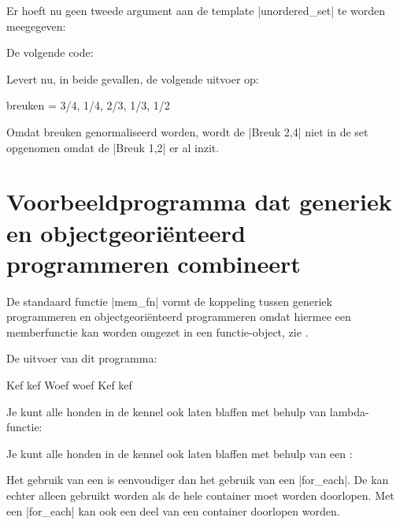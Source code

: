 \begin{cpplstShortInline}

Er hoeft nu geen tweede argument aan de template |unordered_set| te worden meegegeven:


De volgende code:


Levert nu, in beide gevallen, de volgende uitvoer op:
\begin{coutput}
breuken = {3/4, 1/4, 2/3, 1/3, 1/2}
\end{coutput}

Omdat breuken genormaliseerd worden, wordt de |Breuk {2,4}| niet in de set opgenomen omdat de |Breuk {1,2}| er al inzit.

\section{Voorbeeldprogramma dat generiek en objectgeoriënteerd programmeren combineert}
De standaard functie |mem_fn| vormt de koppeling tussen generiek programmeren en objectgeoriënteerd programmeren omdat hiermee een memberfunctie kan worden omgezet in een functie\hyp{}object, zie .


De uitvoer van dit programma:
\begin{coutput}
Kef kef Woef woef Kef kef
\end{coutput}

Je kunt alle honden in de kennel ook laten blaffen met behulp van lambda-functie:

Je kunt alle honden in de kennel ook laten blaffen met behulp van een :

Het gebruik van een  is eenvoudiger dan het gebruik van een |for_each|.
De  kan echter alleen gebruikt worden als de hele container moet worden doorlopen.
Met een |for_each| kan ook een deel van een container doorlopen worden.


\end{cpplstShortInline}
